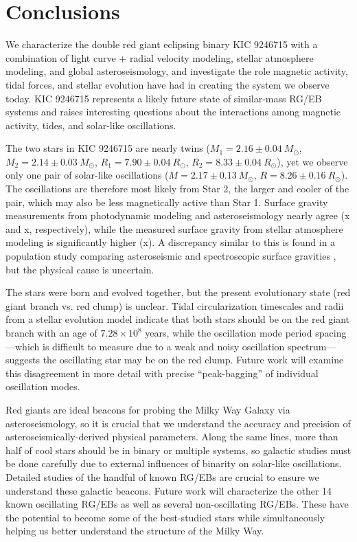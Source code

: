 \section{Conclusions}\label{conclude}
We characterize the double red giant eclipsing binary KIC 9246715 with a combination of light curve + radial velocity modeling, stellar atmosphere modeling, and global asteroseismology, and investigate the role magnetic activity, tidal forces, and stellar evolution have had in creating the system we observe today. KIC 9246715 represents a likely future state of similar-mass RG/EB systems and raises interesting questions about the interactions among magnetic activity, tides, and solar-like oscillations.

The two stars in KIC 9246715 are nearly twins ($M_1 = 2.16 \pm 0.04\ M_{\odot}$, $M_2 = 2.14 \pm 0.03\ M_{\odot}$, $R_1 = 7.90 \pm 0.04 \ R_{\odot}$, $R_2 = 8.33 \pm 0.04 \ R_{\odot}$), yet we observe only one pair of solar-like oscillations ($M = 2.17 \pm 0.13 \ M_{\odot}$, $R = 8.26 \pm 0.16 \ R_{\odot}$). The oscillations are therefore most likely from Star 2, the larger and cooler of the pair, which may also be less magnetically active than Star 1. Surface gravity measurements from photodynamic modeling and asteroseismology nearly agree (x and x, respectively), while the measured surface gravity from stellar atmosphere modeling is significantly higher (x). A discrepancy similar to this is found in a population study comparing asteroseismic and spectroscopic surface gravities \citep{hol15}, but the physical cause is uncertain.

The stars were born and evolved together, but the present evolutionary state (red giant branch vs. red clump) is unclear. Tidal circularization timescales and radii from a stellar evolution model indicate that both stars should be on the red giant branch with an age of $7.28 \times 10^8$ years, while the oscillation mode period spacing---which is difficult to measure due to a weak and noisy oscillation spectrum---suggests the oscillating star may be on the red clump. Future work will examine this disagreement in more detail with precise ``peak-bagging'' of individual oscillation modes.

Red giants are ideal beacons for probing the Milky Way Galaxy via asteroseismology, so it is crucial that we understand the accuracy and precision of asteroseismically-derived physical parameters. Along the same lines, more than half of cool stars should be in binary or multiple systems, so galactic studies must be done carefully due to external influences of binarity on solar-like oscillations. Detailed studies of the handful of known RG/EBs are crucial to ensure we understand these galactic beacons. Future work will characterize the other 14 known oscillating RG/EBs as well as several non-oscillating RG/EBs. These have the potential to become some of the best-studied stars while simultaneously helping us better understand the structure of the Milky Way.
  